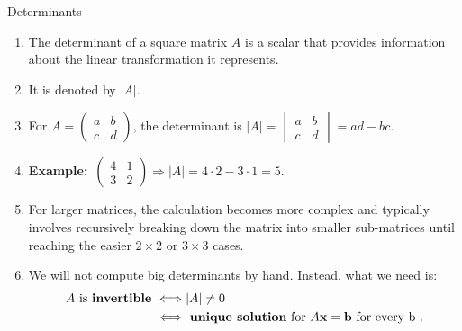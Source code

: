 \documentclass[9pt]{beamer}
\begin{document}
\begin{frame}{Determinants}

\begin{enumerate}[leftmargin = 0.6cm, label = $\bullet$, rightmargin = 0.4cm]

    \item The determinant of a square matrix $A$ is a scalar that provides information about the linear transformation it represents.

    \item It is denoted by $|A|$.

    \item For \(A=\begin{pmatrix} a&b\\ c&d \end{pmatrix}\), the determinant is
    $
    |A|=\begin{vmatrix} a&b\\ c&d \end{vmatrix}=ad-bc.
    $

    \item \textbf{Example:}\ \(\begin{pmatrix}4&1\\3&2\end{pmatrix} \Rightarrow |A|=4\cdot2-3\cdot1=5.\)
    \item For larger matrices, the calculation becomes more complex and typically involves recursively breaking down the matrix into smaller sub-matrices until reaching the easier $2\times 2$ or $3\times 3$ cases. 

    \item We will not compute big determinants by hand. Instead, what we need is:
    \begin{align*}
        A \text{ is \textbf{invertible} } 
        &\Longleftrightarrow |A| \neq 0 \\
        &\Longleftrightarrow \text{ \textbf{unique solution}  for } A{\bf x}={\bf b} \text{ for every b }.
    \end{align*}
        

\end{enumerate}

\end{frame}
\end{document}
